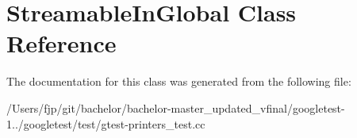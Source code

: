 \hypertarget{class_streamable_in_global}{}\section{Streamable\+In\+Global Class Reference}
\label{class_streamable_in_global}


The documentation for this class was generated from the following file\+:\begin{DoxyCompactItemize}
\item 
/\+Users/fjp/git/bachelor/bachelor-\/master\+\_\+updated\+\_\+vfinal/googletest-\/1../googletest/test/gtest-\/printers\+\_\+test.\+cc\end{DoxyCompactItemize}
